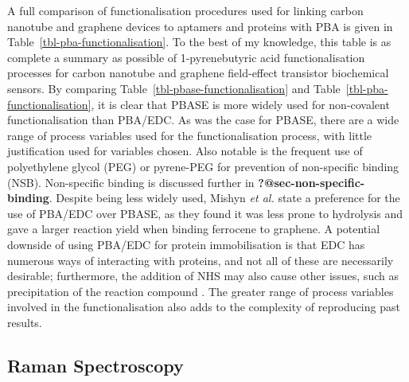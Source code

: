 \documentclass[
  a4paper,
]{scrbook}
\begin{document}
A full comparison of functionalisation procedures used for linking
carbon nanotube and graphene devices to aptamers and proteins with PBA
is given in Table~\ref{tbl-pba-functionalisation}. To the best of my
knowledge, this table is as complete a summary as possible of
1-pyrenebutyric acid functionalisation processes for carbon nanotube and
graphene field-effect transistor biochemical sensors. By comparing
Table~\ref{tbl-pbase-functionalisation} and
Table~\ref{tbl-pba-functionalisation}, it is clear that PBASE is more
widely used for non-covalent functionalisation than PBA/EDC. As was the
case for PBASE, there are a wide range of process variables used for the
functionalisation process, with little justification used for variables
chosen. Also notable is the frequent use of polyethylene glycol (PEG) or
pyrene-PEG for prevention of non-specific binding (NSB). Non-specific
binding is discussed further in \textbf{?@sec-non-specific-binding}.
Despite being less widely used, Mishyn \emph{et al.}
\autocite{Mishyn2022} state a preference for the use of PBA/EDC over
PBASE, as they found it was less prone to hydrolysis and gave a larger
reaction yield when binding ferrocene to graphene. A potential downside
of using PBA/EDC for protein immobilisation is that EDC has numerous
ways of interacting with proteins, and not all of these are necessarily
desirable; furthermore, the addition of NHS may also cause other issues,
such as precipitation of the reaction compound
\autocite{Hermanson2013-4}. The greater range of process variables
involved in the functionalisation also adds to the complexity of
reproducing past results.

\hypertarget{raman-spectroscopy}{%
\subsection{Raman Spectroscopy}\label{raman-spectroscopy}}
\end{document}
